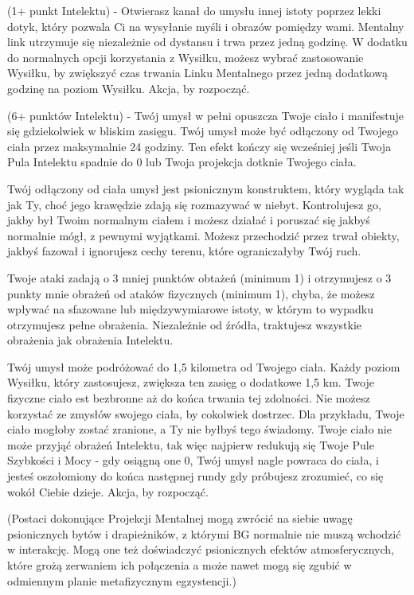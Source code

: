  (1+ punkt Intelektu) - Otwierasz kanał do umysłu innej istoty poprzez lekki dotyk, który pozwala Ci na wysyłanie myśli i obrazów pomiędzy wami. Mentalny link utrzymuje się niezależnie od dystansu i trwa przez jedną godzinę. W dodatku do normalnych opcji korzystania z Wysiłku, możesz wybrać zastosowanie Wysiłku, by zwiększyć czas trwania Linku Mentalnego przez jedną dodatkową godzinę na poziom Wysiłku. Akcja, by rozpocząć. 

 (6+ punktów Intelektu) - Twój umysł w pełni opuszcza Twoje ciało i manifestuje się gdziekolwiek w bliskim zasięgu. Twój umysł może być odłączony od Twojego ciała przez maksymalnie 24 godziny. Ten efekt kończy się wcześniej jeśli Twoja Pula Intelektu spadnie do 0 lub Twoja projekcja dotknie Twojego ciała. 

Twój odłączony od ciała umysł jest psionicznym konstruktem, który wygląda tak jak Ty, choć jego krawędzie zdają się rozmazywać w niebyt. Kontrolujesz go, jakby był Twoim normalnym ciałem i możesz działać i poruszać się jakbyś normalnie mógł, z pewnymi wyjątkami. Możesz przechodzić przez trwał obiekty, jakbyś fazował i ignorujesz cechy terenu, które ograniczałyby Twój ruch.

Twoje ataki zadają o 3 mniej punktów obtażeń (minimum 1) i otrzymujesz o 3 punkty mnie obrażeń od ataków fizycznych (minimum 1), chyba, że możesz wpływać na sfazowane lub międzywymiarowe istoty, w którym to wypadku otrzymujesz pełne obrażenia. Niezależnie od źródła, traktujesz wszystkie obrażenia jak obrażenia Intelektu.

Twój umysł może podróżować do 1,5 kilometra od Twojego ciała. Każdy poziom Wysiłku, który zastosujesz, zwiększa ten zasięg o dodatkowe 1,5 km. Twoje fizyczne ciało est bezbronne aż do końca trwania tej zdolności. Nie możesz korzystać ze zmysłów swojego ciała, by cokolwiek dostrzec. Dla przykładu, Twoje ciało mogłoby zostać zranione, a Ty nie byłbyś tego świadomy. Twoje ciało nie może przyjąć obrażeń Intelektu, tak więc najpierw redukują się Twoje Pule Szybkości i Mocy - gdy osiągną one 0, Twój umysł nagle powraca do ciała, i jesteś oszołomiony do końca następnej rundy gdy próbujesz zrozumieć, co się wokół Ciebie dzieje. Akcja, by rozpocząć. 

(Postaci dokonujące Projekcji Mentalnej mogą zwrócić na siebie uwagę psionicznych bytów i drapieżników, z którymi BG normalnie nie muszą wchodzić w interakcję. Mogą one też doświadczyć psionicznych efektów atmosferycznych, które grożą zerwaniem ich połączenia a może nawet mogą się zgubić w odmiennym planie metafizycznym egzystencji.)

